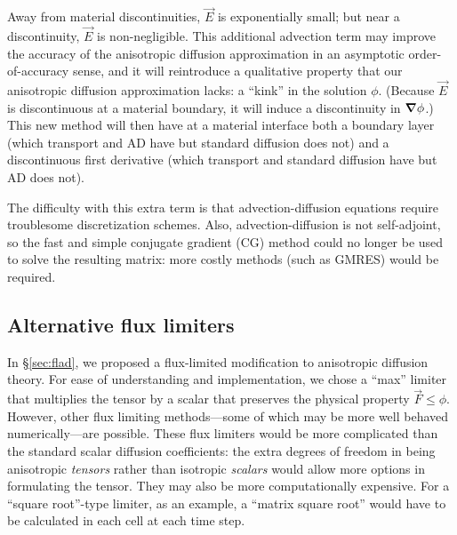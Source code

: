 Away from material discontinuities, $\vec{E}$ is exponentially small; but
near a discontinuity, $\vec{E}$ is non-negligible. This additional advection
term may
improve the accuracy of the anisotropic diffusion approximation in an
asymptotic order-of-accuracy sense, and it will reintroduce a qualitative
property that our anisotropic
diffusion approximation lacks: a ``kink'' in the solution $\phi$. (Because
$\vec{E}$ is discontinuous at a material boundary, it will induce a
discontinuity in $\bm{\nabla} \phi$.) This new method will then have at a material
interface both a boundary layer (which transport and AD have but standard
diffusion does not) and a discontinuous first derivative (which transport and
standard diffusion have but AD does not).

The difficulty with this extra term is that advection-diffusion equations
require troublesome discretization schemes. Also, advection-diffusion is
not self-adjoint,
so the fast and simple conjugate gradient (CG) method could no longer be used to
solve the resulting matrix: more costly methods (such as GMRES) would be
required.

\subsection{Alternative flux limiters}

In \S\ref{sec:flad}, we proposed a flux-limited modification to anisotropic
diffusion theory. For ease of understanding and implementation, we chose a
``max'' limiter that multiplies the tensor by a scalar that preserves the
physical property $\vec{F} \le \phi$. However, other flux limiting
methods---some of which may be more well behaved numerically---are possible.
These flux limiters would be more complicated than the standard scalar diffusion
coefficients: the extra degrees of freedom in being anisotropic
\emph{tensors} rather than isotropic \emph{scalars} would allow more options in
formulating the tensor.
They may also be more computationally expensive. For a ``square root''-type
limiter, as an
example, a ``matrix square root'' would have to be calculated in each cell at
each time step.


